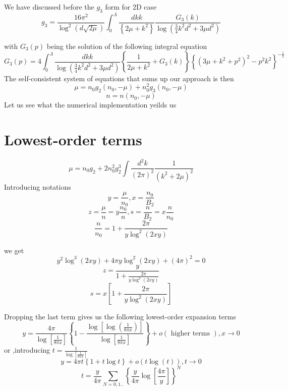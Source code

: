 \documentclass[8pt,letterpaper,notitlepage]{article}
\begin{document}
We have discussed before the
$g_3$ form for 2D case
\[
g_3 = \frac{16 \pi^2}{\log^2 ( d \sqrt{2 \mu} )}
\int_0^{\Lambda} \frac{dk k}{\left\{ 2 \mu + k^2 \right\}} \frac{G_3(k)}
{\log \left(\frac{3}{4} k^2 d^2  + 3 \mu d^2 \right)}
\]


with $G_3(p)$ being the solution of the following integral equation 
\[
G_3(p) = 4 \int^{\Lambda}_0 \frac{dk k}{\log \left( \frac{3}{4} k^2 d^2  + 3 \mu d^2 \right)}
\left\{ \frac{1}{2 \mu + k^2} + G_3(k) \right\}
\left\{ 
(3 \mu + k^2 + p^2)^2 -  p^2 k^2
\right\}^{-\frac{1}{2}}
\]
The self-consistent system of equations that sums up our approach is then
\[
\mu = n_0 g_2 (n_0, - \mu) + n_0^2 g_3 (n_0, - \mu)
\]
\[
n = n (n_0, - \mu)
\]
Let us see what the numerical implementation yeilds us




\section{Lowest-order terms}
\[
\mu = n_0 g_2 + 2 n_0^2 g_2^3 \int \frac{d^2 k}{(2 \pi)^2} \frac{1}{\left( k^2 + 2 \mu \right)^2}
\]
Introducing notations 
\[
y = \frac{\mu}{n_0 }, x = \frac{n_0}{B_2}
\]
\[
z = \frac{\mu}{n } = y \frac{n_0}{n}, s = \frac{n}{B_2} = x \frac{n}{n_0}
\]
\[
\frac{n}{n_0} = 1 + \frac{2 \pi}{y \log^2 (2xy)}
\]

we get
\[
y^2 \log^3 (2 x y) + 4 \pi y \log^2 (2 x y ) + (4 \pi)^2 =0
\]
\[
z = \frac{y}{1 + \frac{2 \pi}{y \log^2 (2xy)}}
\]
\[
s = x \left[ 1 + \frac{2 \pi}{y \log^2 (2xy)} \right]
\]

Dropping the last term gives us the following lowest-order expansion terms
\[
y = \frac{4 \pi}{\log \left[ \frac{1}{8 \pi x} \right]} 
\left\{ 1 - \frac{\log \left[ \log \left( \frac{1}{8 \pi x} \right) \right]}{\log \left[ \frac{1}{8 \pi x} \right]} \right\}  + o(\textrm{ higher terms }), x \rightarrow 0
\]
or ,introducing $t = \frac{1}{\log \left[ \frac{1}{8 \pi x} \right]}$
\[
y = 4 \pi t \left\{ 1 + t \log t \right\} + o(t \log(t) ) , t  \rightarrow 0
\]
\[
t = \frac{y}{4 \pi} \sum_{N=0, 1..} \left\{ \frac{y}{4 \pi} \log \left[ \frac{4 \pi}{y} \right] \right\}^N
\]
\end{document}

